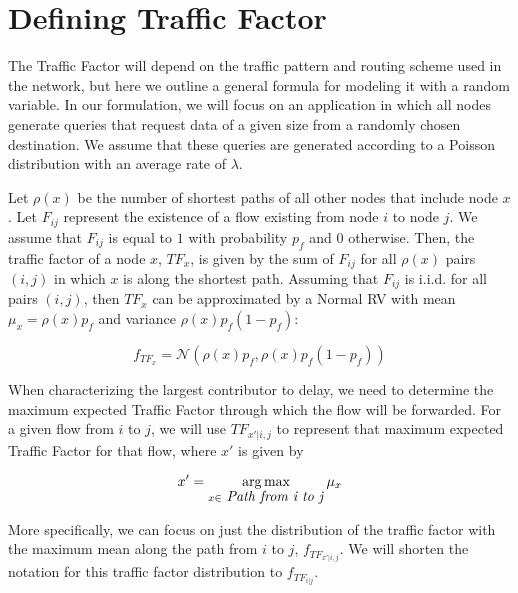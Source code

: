 \section{Defining Traffic Factor}
\label{sec:def_tf}

The Traffic Factor will depend on the traffic pattern and routing scheme used in the network, but here we outline a general formula for modeling it with a random variable.  In our formulation, we will focus on an application in which all nodes generate queries that request data of a given size from a randomly chosen destination.  We assume that these queries are generated according to a Poisson distribution with an average rate of $\lambda$.  

Let $\rho(x)$ be the number of shortest paths of all other nodes that include node $x$.  Let $F_{ij}$ represent the existence of a flow existing from node $i$ to node $j$.  We assume that $F_{ij}$ is equal to $1$ with probability $p_f$ and $0$ otherwise.  Then, the traffic factor of a node $x$, $TF_x$, is given by the sum of $F_{ij}$ for all $\rho(x)$ pairs $(i,j)$ in which $x$ is along the shortest path.  Assuming that $F_{ij}$ is i.i.d. for all pairs $(i,j)$, then $TF_x$ can be approximated by a Normal RV with mean $\mu_x = \rho(x) p_f$ and variance $\rho(x) p_f (1-p_f)$:

\begin{equation}
	f_{TF_x} = \mathcal{N}(\rho(x) p_f, \rho(x) p_f (1-p_f)) 
\end{equation}

When characterizing the largest contributor to delay, we need to determine the maximum expected Traffic Factor through which the flow will be forwarded.  For a given flow from $i$ to $j$, we will use $TF_{x' | i,j}$ to represent that maximum expected Traffic Factor for that flow, where $x'$ is given by  

\begin{equation}
\label{eq:max_tf_node}
	x' = \argmax_{x \in \mbox{ \emph{Path from i to j}} } \mu_x %
\end{equation}

More specifically, we can focus on just the distribution of the traffic factor with the maximum mean along the path from $i$ to $j$, $f_{TF_{x' | i,j}}$.  We will shorten the notation for this traffic factor distribution to $f_{TF_{i | j}}$.  %

